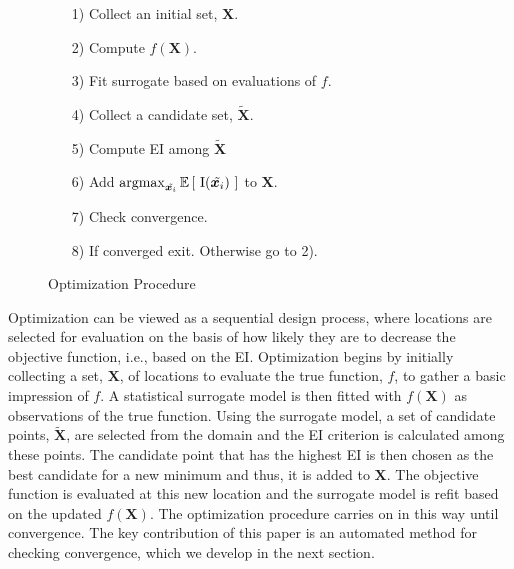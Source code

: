 \documentclass[12pt]{article}
\newcommand{\E}[1]{
        \mathbb{E}\left[~#1~\right]
}
\newcommand{\argmax}{\operatornamewithlimits{argmax}}
\def \Eix {
        \mathbb{E}\left[~\text{I}(\bm{x})~\right]
}
\begin{document}
%
%
\begin{figure}
	\vspace{-0.8cm}
        \singlespacing
        \caption{Optimization Procedure}
        \begin{itemize}
        \item[1)] Collect an initial set, $\bm{X}$.
        \item[2)] Compute $f(\bm{X})$.
        \item[3)] Fit surrogate based on evaluations of $f$.
        \item[4)] Collect a candidate set, $\tilde{\bm{X}}$.
        \item[5)] Compute EI among $\tilde{\bm{X}}$
        \item[6)] Add $\argmax_{\tilde{\bm{x}_i}} \E{\text{I}(\tilde{\bm{x}_i})}$ to $\bm{X}$.
        \item[7)] Check convergence.
        \item[8)] If converged exit. Otherwise go to 2).
        \end{itemize}
        \doublespacing
        \label{procedure}
\end{figure}
%
Optimization can be viewed as a sequential design process, where locations are selected for evaluation on the basis of how likely they are to decrease the objective function, i.e., based on the EI.
Optimization begins by initially collecting a set, $\bm{X}$, of locations to evaluate the true function, $f$, to gather a basic impression of $f$.
A statistical surrogate model is then fitted with $f(\bm{X})$ as observations of the true function.
Using the surrogate model, a set of candidate points, $\tilde{\bm{X}}$, are selected from the domain and the EI criterion is calculated among these points.
%
The candidate point that has the highest EI is then chosen as the
%
best candidate for a new minimum and thus, it is added to $\bm{X}$.
The objective function is evaluated at this new location and the surrogate model is refit based on the updated $f(\bm{X})$.
%
The optimization procedure carries on in this way until convergence.  The key contribution of this paper is an automated method for checking convergence, which we develop in the next section. 
\end{document}
